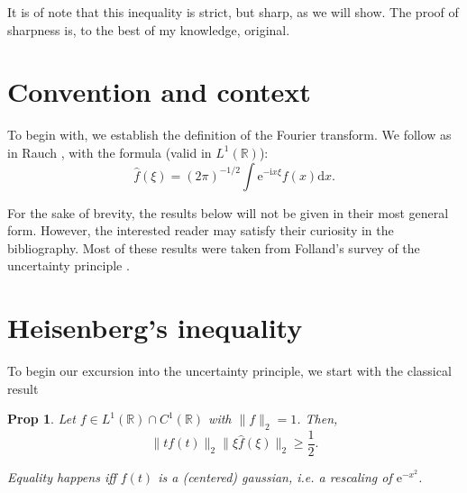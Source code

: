 \documentclass{amsart}
\newcommand{\R}{\mathbb{R}}
\newcommand{\dd}{\mathrm{d}}
\newcommand{\e}{\mathrm{e}}
\newcommand{\I}{\mathrm{i}}
\newtheorem{prop}{Prop}
\begin{document}
It is of note that this inequality is strict, but sharp, as we will show. The proof of sharpness is, to the best of my knowledge, original.

\section{Convention and context}

To begin with, we establish the definition of the Fourier transform. We follow as in Rauch \cite{rauch}, with the formula (valid in $L^1(\R)$):
\[\hat f(\xi) = (2 \pi)^{-1/2} \int \e^{- \I x \xi} f(x) \dd x.\]

For the sake of brevity, the results below will not be given in their most general form. However, the interested reader may satisfy their curiosity in the bibliography. Most of these results were taken from Folland's survey of the uncertainty principle \cite{survey}.

\section{Heisenberg's inequality}\label{sec:heisenberg}

To begin our excursion into the uncertainty principle, we start with the classical result

\begin{prop}\label{heisenbergprop1}
Let $f \in L^1(\R) \cap C^1(\R)$ with $\lVert f \rVert_2 = 1$. Then,
\[\lVert t f(t) \rVert_2 \lVert \xi \hat f(\xi) \rVert_2 \geq \frac12.\]

Equality happens iff $f(t)$ is a (centered) gaussian, i.e. a rescaling of $\e^{- x^2}$.
\end{prop}
\end{document}
